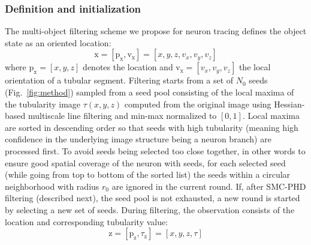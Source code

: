\documentclass[noinfo,nocrop,final]{bioinfo}
\begin{document}
\subsubsection{Definition and initialization}
\label{sssec:initialization}
The multi-object filtering scheme we propose for neuron tracing defines the object state as an oriented location:
\begin{equation}
\label{eq:obj-state}
\mathrm{x} = \left[ \mathrm{p}_{\mathrm{x}}, \mathrm{v}_{\mathrm{x}} \right] = \left[x, y, z, v_x, v_y, v_z\right] 
\end{equation}
where $\mathrm{p}_{\mathrm{x}}=[x, y, z]$ denotes the location and $\mathrm{v}_{\mathrm{x}}=[v_x, v_y, v_z]$ the local orientation of a tubular segment. Filtering starts from a set of $N_0$ seeds (Fig.~\ref{fig:method}) sampled from a seed pool consisting of the local maxima of the tubularity image $\tau(x,y,z)$ computed from the original image using Hessian-based multiscale line filtering \citep{Sato-1998} and min-max normalized to $[0,1]$. Local maxima are sorted in descending order so that seeds with high tubularity (meaning high confidence in the underlying image structure being a neuron branch) are processed first. To avoid seeds being selected too close together, in other words to ensure good spatial coverage of the neuron with seeds, for each selected seed (while going from top to bottom of the sorted list) the seeds within a circular neighborhood with radius $r_0$ are ignored in the current round. If, after SMC-PHD filtering (described next), the seed pool is not exhausted, a new round is started by selecting a new set of seeds. During filtering, the observation consists of the location and corresponding tubularity value:
\begin{equation}
\label{eq:observation}
\mathrm{z} = \left[ \mathrm{p}_{\mathrm{z}}, \tau_{\mathrm{z}} \right] = \left[x, y, z, \tau\right]
\end{equation}
\end{document}
